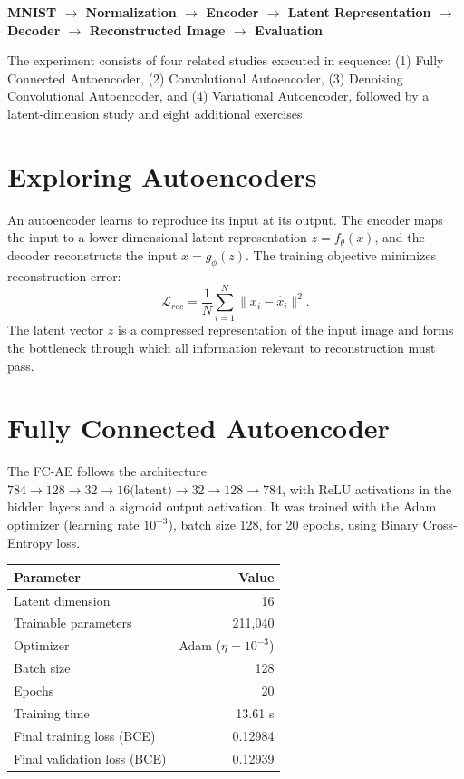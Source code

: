 \documentclass[10pt]{article}
\begin{document}
\begin{center}
\textbf{MNIST $\rightarrow$ Normalization $\rightarrow$ Encoder $\rightarrow$ Latent Representation
$\rightarrow$ Decoder $\rightarrow$ Reconstructed Image $\rightarrow$ Evaluation}
\end{center}

The experiment consists of four related studies executed in sequence: (1) Fully Connected Autoencoder,
(2) Convolutional Autoencoder, (3) Denoising Convolutional Autoencoder, and (4) Variational Autoencoder,
followed by a latent-dimension study and eight additional exercises.

\section{Exploring Autoencoders}

An autoencoder learns to reproduce its input at its output. The encoder maps the input to a
lower-dimensional latent representation $z = f_\theta(x)$, and the decoder reconstructs the input
$\hat{x} = g_\phi(z)$. The training objective minimizes reconstruction error:
\[
\mathcal{L}_{rec} = \frac{1}{N}\sum_{i=1}^{N} \lVert x_i - \hat{x}_i \rVert^2 .
\]
The latent vector $z$ is a compressed representation of the input image and forms the bottleneck through
which all information relevant to reconstruction must pass.

\section{Fully Connected Autoencoder}

The FC-AE follows the architecture $784 \rightarrow 128 \rightarrow 32 \rightarrow 16\text{(latent)}
\rightarrow 32 \rightarrow 128 \rightarrow 784$, with ReLU activations in the hidden layers and a
sigmoid output activation. It was trained with the Adam optimizer (learning rate $10^{-3}$), batch size
128, for 20 epochs, using Binary Cross-Entropy loss.

\begin{center}
\begin{tabular}{|l|r|}
\hline
\textbf{Parameter} & \textbf{Value}\\
\hline
Latent dimension & 16\\
Trainable parameters & 211{,}040\\
Optimizer & Adam ($\eta=10^{-3}$)\\
Batch size & 128\\
Epochs & 20\\
Training time & 13.61 s\\
Final training loss (BCE) & 0.12984\\
Final validation loss (BCE) & 0.12939\\
\hline
\end{tabular}
\end{center}
\end{document}
